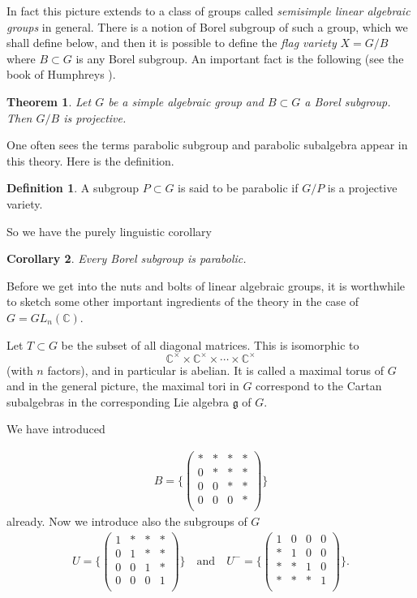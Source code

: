 \documentclass[12pt]{article}
\theoremstyle{plain}
\newtheorem{thm}{Theorem}[section]
\newtheorem{cor}[thm]{Corollary}
\theoremstyle{definition}
\newtheorem{defn}{Definition}[section]
\numberwithin{equation}{section}
\newcommand{\C}{\mathbb{C}}
\newcommand{\g}{\mathfrak{g}}
\begin{document}
In fact this picture extends to a class of groups called \emph{semisimple linear algebraic groups} in general. There is a notion of Borel subgroup of such a group, which we shall define below, and then it is possible to define the \emph{flag variety} $X = G / B$ where $B \subset G$ is any Borel subgroup. An important fact is the following (see the book of Humphreys {\cite[Theorem 21.3]{Humphreys.alg.grp}}).
\begin{thm}
Let $G$ be a simple algebraic group and $B \subset G$ a Borel subgroup. Then $G / B$ is projective.
\end{thm}
One often sees the terms parabolic subgroup and parabolic subalgebra appear in this theory. Here is the definition.
\begin{defn}
A subgroup $P \subset G$ is said to be parabolic if $G / P$ is a projective variety.
\end{defn}
So we have the purely linguistic corollary
\begin{cor}
Every Borel subgroup is parabolic.
\end{cor}

Before we get into the nuts and bolts of linear algebraic groups, it is worthwhile to sketch some other important ingredients of the theory in the case of $G = GL_n(\C)$.

Let $T \subset G$ be the subset of all diagonal matrices. This is isomorphic to
\[
\C^\times \times \C^\times \times \cdots \times \C^\times
\]
(with $n$ factors), and in particular is abelian. It is called a maximal torus of $G$ and in the general picture, the maximal tori in $G$ correspond to the Cartan subalgebras in the corresponding Lie algebra $\g$ of $G$.

We have introduced

\begin{align*}
B = \{\left(
\begin{array}{cccc}
* & * & * & * \\
0 & * & * & * \\
0 & 0 & * & * \\
0 & 0 & 0 & * \\
\end{array}
\right)\}
\end{align*}
already. Now we introduce also the subgroups of $G$
\begin{align*}
U = \{\left(
\begin{array}{cccc}
1 & * & * & * \\
0 & 1 & * & * \\
0 & 0 & 1 & * \\
0 & 0 & 0 & 1 \\
\end{array}
\right)\}
%
\quad \text{and} \quad
%
U^- = \{\left(
\begin{array}{cccc}
1 & 0 & 0 & 0 \\
* & 1 & 0 & 0 \\
* & * & 1 & 0 \\
* & * & * & 1 \\
\end{array}
\right)\}.
\end{align*}
\end{document}
